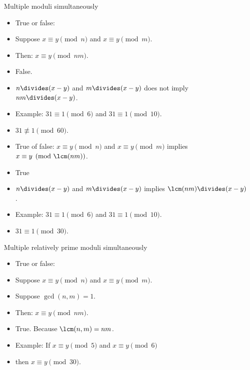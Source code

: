 \documentclass[handout]{beamer}
\begin{document}
\begin{frame}{Multiple moduli simultaneously}

\begin{itemize}
  \item True or false:
  \item Suppose $x\equiv y \pmod n$ and $x\equiv y \pmod m$.
  \item Then: $x\equiv y \pmod {nm}$.
  \item False.
  \item $n \divides (x-y)$ and $m \divides (x-y)$ does not imply $nm \divides (x-y)$.
  \item Example: $31 \equiv 1 \pmod 6$ and $31 \equiv 1 \pmod {10}$.
  \item $31 \not\equiv 1 \pmod {60}$.
  \item True of false: $x\equiv y \pmod n$ and $x\equiv y \pmod m$ implies $x\equiv y \pmod {\lcm(nm)}$.
  \item True
  \item $n \divides (x-y)$ and $m \divides (x-y)$ implies $\lcm(nm) \divides (x-y)$.
  \item Example: $31 \equiv 1 \pmod 6$ and $31 \equiv 1 \pmod {10}$.
  \item $31 \equiv 1 \pmod {30}$.
  \end{itemize}

\end{frame}

\begin{frame}{Multiple relatively prime moduli simultaneously}

\begin{itemize}
  \item True or false:
  \item Suppose $x\equiv y \pmod n$ and $x\equiv y \pmod m$.
  \item Suppose $\gcd(n,m) = 1$.
  \item Then: $x\equiv y \pmod {nm}$.
  \item True. Because $\lcm(n,m) = nm$.
  \item Example: If $x\equiv y \pmod 5$ and $x\equiv y \pmod 6$
  \item then $x\equiv y \pmod {30}$.
  \end{itemize}

\end{frame}
\end{document}
